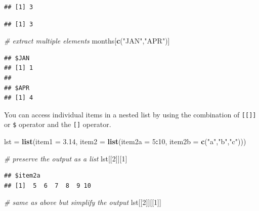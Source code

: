 \documentclass[
]{book}
\newenvironment{Shaded}{\begin{snugshade}}{\end{snugshade}}
\newcommand{\CommentTok}[1]{\textcolor[rgb]{0.56,0.35,0.01}{\textit{#1}}}
\newcommand{\DataTypeTok}[1]{\textcolor[rgb]{0.13,0.29,0.53}{#1}}
\newcommand{\DecValTok}[1]{\textcolor[rgb]{0.00,0.00,0.81}{#1}}
\newcommand{\FloatTok}[1]{\textcolor[rgb]{0.00,0.00,0.81}{#1}}
\newcommand{\KeywordTok}[1]{\textcolor[rgb]{0.13,0.29,0.53}{\textbf{#1}}}
\newcommand{\NormalTok}[1]{#1}
\newcommand{\OperatorTok}[1]{\textcolor[rgb]{0.81,0.36,0.00}{\textbf{#1}}}
\newcommand{\StringTok}[1]{\textcolor[rgb]{0.31,0.60,0.02}{#1}}
\begin{document}
\begin{verbatim}
## [1] 3
\end{verbatim}

\begin{Shaded}
\end{Shaded}

\begin{verbatim}
## [1] 3
\end{verbatim}

\begin{Shaded}
\begin{Highlighting}[]
\CommentTok{# extract multiple elements}
\NormalTok{months[}\KeywordTok{c}\NormalTok{(}\StringTok{"JAN"}\NormalTok{,}\StringTok{"APR"}\NormalTok{)]}
\end{Highlighting}
\end{Shaded}

\begin{verbatim}
## $JAN
## [1] 1
## 
## $APR
## [1] 4
\end{verbatim}

You can access individual items in a nested list by using the combination of \texttt{{[}{[}{]}{]}} or \texttt{\$} operator and the \texttt{{[}{]}} operator.

\begin{Shaded}
\begin{Highlighting}[]
\NormalTok{lst =}\StringTok{ }\KeywordTok{list}\NormalTok{(}\DataTypeTok{item1 =} \FloatTok{3.14}\NormalTok{,}
            \DataTypeTok{item2 =} \KeywordTok{list}\NormalTok{(}\DataTypeTok{item2a =} \DecValTok{5}\OperatorTok{:}\DecValTok{10}\NormalTok{,}
                         \DataTypeTok{item2b =} \KeywordTok{c}\NormalTok{(}\StringTok{"a"}\NormalTok{,}\StringTok{"b"}\NormalTok{,}\StringTok{"c"}\NormalTok{)))}

\CommentTok{# preserve the output as a list}
\NormalTok{lst[[}\DecValTok{2}\NormalTok{]][}\DecValTok{1}\NormalTok{]}
\end{Highlighting}
\end{Shaded}

\begin{verbatim}
## $item2a
## [1]  5  6  7  8  9 10
\end{verbatim}

\begin{Shaded}
\begin{Highlighting}[]
\CommentTok{# same as above but simplify the output}
\NormalTok{lst[[}\DecValTok{2}\NormalTok{]][[}\DecValTok{1}\NormalTok{]]}
\end{Highlighting}
\end{Shaded}
\end{document}
